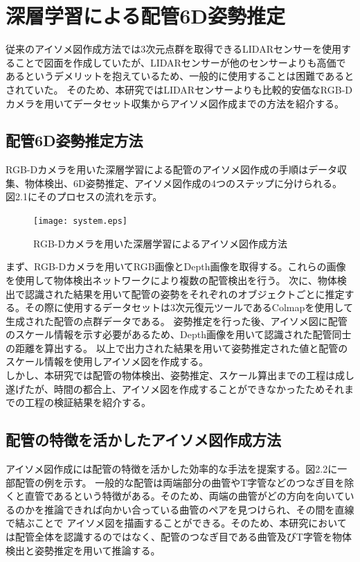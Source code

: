\chapter{%
深層学習による配管6D姿勢推定}

従来のアイソメ図作成方法では3次元点群を取得できるLIDARセンサーを使用することで図面を作成していたが、LIDARセンサーが他のセンサーよりも高価であるというデメリットを抱えているため、一般的に使用することは困難であるとされていた。
そのため、本研究ではLIDARセンサーよりも比較的安価なRGB-Dカメラを用いてデータセット収集からアイソメ図作成までの方法を紹介する。

\section{配管6D姿勢推定方法}
RGB-Dカメラを用いた深層学習による配管のアイソメ図作成の手順はデータ収集、物体検出、6D姿勢推定、アイソメ図作成の4つのステップに分けられる。
図2.1にそのプロセスの流れを示す。

\begin{figure}[htbt]
	\texttt{[image: system.eps]}
	\caption{RGB-Dカメラを用いた深層学習によるアイソメ図作成方法}
	\label{fig:f2}
\end{figure}

まず、RGB-Dカメラを用いてRGB画像とDepth画像を取得する。これらの画像を使用して物体検出ネットワークにより複数の配管検出を行う。
次に、物体検出で認識された結果を用いて配管の姿勢をそれぞれのオブジェクトごとに推定する。その際に使用するデータセットは3次元復元ツールであるColmapを使用して生成された配管の点群データである。
姿勢推定を行った後、アイソメ図に配管のスケール情報を示す必要があるため、Depth画像を用いて認識された配管同士の距離を算出する。
以上で出力された結果を用いて姿勢推定された値と配管のスケール情報を使用しアイソメ図を作成する。\\
しかし、本研究では配管の物体検出、姿勢推定、スケール算出までの工程は成し遂げたが、時間の都合上、アイソメ図を作成することができなかったためそれまでの工程の検証結果を紹介する。

\section{配管の特徴を活かしたアイソメ図作成方法}
アイソメ図作成には配管の特徴を活かした効率的な手法を提案する。図2.2に一部配管の例を示す。
一般的な配管は両端部分の曲管やT字管などのつなぎ目を除くと直管であるという特徴がある。そのため、両端の曲管がどの方向を向いているのかを推論できれば向かい合っている曲管のペアを見つけられ、その間を直線で結ぶことで
アイソメ図を描画することができる。そのため、本研究においては配管全体を認識するのではなく、配管のつなぎ目である曲管及びT字管を物体検出と姿勢推定を用いて推論する。


